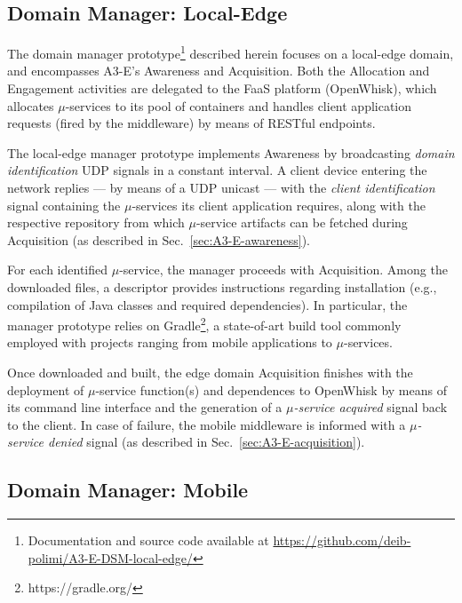 \subsection{Domain Manager: Local-Edge}\label{sec:local-edge-domain-DSM}


The domain manager prototype\footnote{Documentation and source code available at \url{https://github.com/deib-polimi/A3-E-DSM-local-edge/}} described herein focuses on a local-edge domain, and encompasses A3-E's Awareness and Acquisition. Both the Allocation and Engagement activities are delegated to the FaaS platform (OpenWhisk), which allocates $\mu$-services to its pool of containers and handles client application requests (fired by the middleware) by means of RESTful endpoints.

The local-edge manager prototype implements Awareness by broadcasting \textit{domain identification} UDP signals in a constant interval. A client device entering the network replies --- by means of a UDP unicast --- with the \textit{client identification} signal containing the $\mu$-services its client application requires, along with the respective repository from which $\mu$-service artifacts can be fetched during Acquisition (as described in Sec.~\ref{sec:A3-E-awareness}). 

For each identified $\mu$-service, the manager proceeds with Acquisition. Among the downloaded files, a descriptor provides instructions regarding installation (e.g., compilation of Java classes and required dependencies). In particular, the manager prototype relies on Gradle\footnote{https://gradle.org/}, a state-of-art build tool commonly employed with projects ranging from mobile applications to $\mu$-services.

Once downloaded and built, the edge domain Acquisition finishes with the deployment of $\mu$-service function(s) and dependences to OpenWhisk by means of its command line interface and the generation of a \textit{$\mu$-service acquired} signal back to the client. In case of failure, the mobile middleware is informed with a \textit{$\mu$-service denied} signal (as described in Sec.~\ref{sec:A3-E-acquisition}).

\subsection{Domain Manager: Mobile}\label{sec:mobile-domain-DSM}

